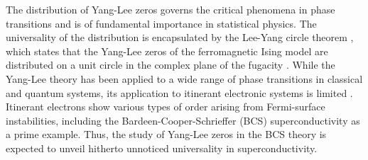 \documentclass[aps,prl,twocolumn,superscriptaddress]{revtex4-1}
\begin{document}
\begin{bibunit}[apsrev4-2]
The distribution of Yang-Lee zeros governs the critical phenomena in phase transitions \cite{Fisher1965,Fisher:1978vn} and is of fundamental importance in statistical physics. The universality of the distribution is encapsulated by the Lee-Yang circle theorem \cite{PhysRev.87.404,PhysRev.87.410}, which states that the Yang-Lee zeros of the ferromagnetic Ising model are distributed on a unit circle in the complex plane of the fugacity \cite{Simon:1973tr,Newman:1974wi,Lieb:1981vb,Kortman:1971tw}. While the Yang-Lee theory has been applied to a wide range of phase transitions in classical \cite{PhysRevLett.84.4794,PhysRevLett.84.814,PhysRevLett.89.080601,PhysRevLett.110.248101} and quantum \cite{Gehlen_1991,Sumaryada:2007uu,PhysRevB.53.7704,Matsumoto2020,PhysRevResearch.3.033206,PhysRevB.106.054402,PhysRevE.96.032116,PhysRevX.11.041018,PhysRevE.96.032116,Fredrik2023,PhysRevLett.131.080403} systems, its application to itinerant electronic systems is limited \cite{Sumaryada:2007uu,PhysRevB.53.7704}. Itinerant electrons show various types of order arising from Fermi-surface instabilities, including the Bardeen-Cooper-Schrieffer (BCS) superconductivity \cite{Bardeen:1957tx} as a prime example. Thus, the study of Yang-Lee zeros in the BCS theory is expected to unveil hitherto unnoticed universality in superconductivity.



\end{bibunit}
\end{document}
